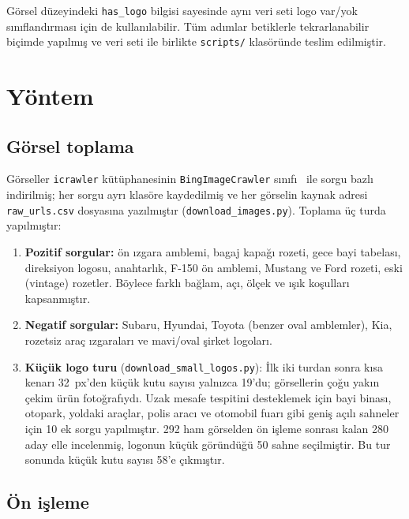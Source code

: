 \documentclass[conference]{IEEEtran}
\newcommand{\kod}[1]{\texttt{\small #1}}
\begin{document}
Görsel düzeyindeki \kod{has\_logo} bilgisi sayesinde aynı veri seti logo var/yok
sınıflandırması için de kullanılabilir. Tüm adımlar betiklerle tekrarlanabilir biçimde
yapılmış ve veri seti ile birlikte \kod{scripts/} klasöründe teslim edilmiştir.

\section{Yöntem}

\subsection{Görsel toplama}

Görseller \kod{icrawler} kütüphanesinin \kod{BingImageCrawler} sınıfı~\cite{icrawler} ile
sorgu bazlı indirilmiş; her sorgu ayrı klasöre kaydedilmiş ve her görselin kaynak adresi
\kod{raw\_urls.csv} dosyasına yazılmıştır (\kod{download\_images.py}). Toplama üç turda
yapılmıştır:

\begin{enumerate}
\item \textbf{Pozitif sorgular:} ön ızgara amblemi, bagaj kapağı rozeti, gece bayi tabelası,
direksiyon logosu, anahtarlık, F-150 ön amblemi, Mustang ve Ford rozeti, eski (vintage)
rozetler. Böylece farklı bağlam, açı, ölçek ve ışık koşulları kapsanmıştır.
\item \textbf{Negatif sorgular:} Subaru, Hyundai, Toyota (benzer oval amblemler), Kia,
rozetsiz araç ızgaraları ve mavi/oval şirket logoları.
\item \textbf{Küçük logo turu} (\kod{download\_small\_logos.py}): İlk iki turdan sonra kısa
kenarı 32~px'den küçük kutu sayısı yalnızca 19'du; görsellerin çoğu yakın çekim ürün
fotoğrafıydı. Uzak mesafe tespitini desteklemek için bayi binası, otopark, yoldaki araçlar,
polis aracı ve otomobil fuarı gibi geniş açılı sahneler için 10 ek sorgu yapılmıştır. 292 ham
görselden ön işleme sonrası kalan 280 aday elle incelenmiş, logonun küçük göründüğü 50 sahne
seçilmiştir. Bu tur sonunda küçük kutu sayısı 58'e çıkmıştır.
\end{enumerate}

\subsection{Ön işleme}
\end{document}
